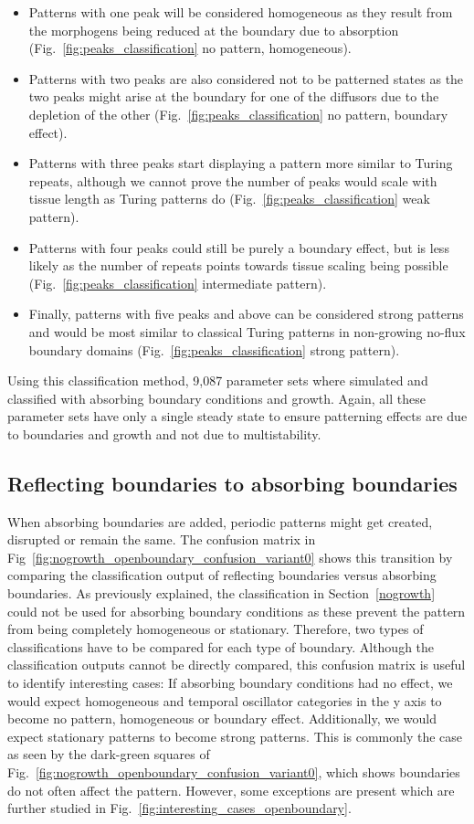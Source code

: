 \begin{itemize}
    \item Patterns with one peak will be considered homogeneous as they result from the morphogens being reduced at the boundary due to absorption (Fig.~\ref{fig:peaks_classification} no pattern, homogeneous).
    \item Patterns with two peaks are also considered not to be patterned states as the two peaks might arise at the boundary for one of the diffusors due to the depletion of the other (Fig.~\ref{fig:peaks_classification} no pattern, boundary effect).
    \item Patterns with three peaks start displaying a pattern more similar to Turing repeats, although we cannot prove the number of peaks would scale with tissue length as Turing patterns do (Fig.~\ref{fig:peaks_classification} weak pattern).
    \item Patterns with four peaks could still be purely a boundary effect, but is less likely as the number of repeats points towards tissue scaling being possible (Fig.~\ref{fig:peaks_classification} intermediate pattern).
    \item Finally, patterns with five peaks and above can be considered strong patterns and would be most similar to classical Turing patterns in non-growing no-flux boundary domains (Fig.~\ref{fig:peaks_classification} strong pattern).
\end{itemize}
Using this classification method, 9,087 parameter sets where simulated and classified with absorbing boundary conditions and growth.
Again, all these parameter sets have only a single steady state to ensure patterning effects are due to boundaries and growth and not due to multistability.


\subsection{Reflecting boundaries to absorbing boundaries}
When absorbing boundaries are added, periodic patterns might get created, disrupted or remain the same.
The confusion matrix in Fig~\ref{fig:nogrowth_openboundary_confusion_variant0} shows this transition by comparing the classification output of reflecting boundaries versus absorbing boundaries.
As previously explained, the classification in Section~\ref{nogrowth} could not be used for absorbing boundary conditions as these prevent the pattern from being completely homogeneous or stationary.
Therefore, two types of classifications have to be compared for each type of boundary.
Although the classification outputs cannot be directly compared, this confusion matrix is useful to identify interesting cases:
If absorbing boundary conditions had no effect, we would expect homogeneous and temporal oscillator categories in the y axis to become no pattern, homogeneous or boundary effect.
Additionally, we would expect stationary patterns to become strong patterns.
This is commonly the case as seen by the dark-green squares of Fig.~\ref{fig:nogrowth_openboundary_confusion_variant0}, which shows boundaries do not often affect the pattern.
However, some exceptions are present which are further studied in Fig.~\ref{fig:interesting_cases_openboundary}.

